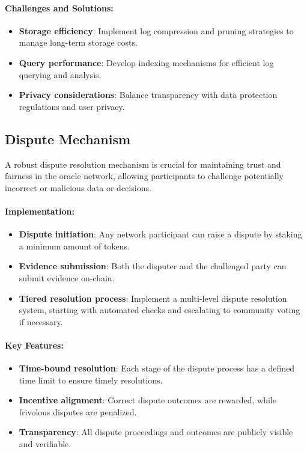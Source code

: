 \documentclass[12pt,a4paper]{article}
\begin{document}
	\paragraph{Challenges and Solutions:}
	\begin{itemize}
		\item \textbf{Storage efficiency}: Implement log compression and pruning strategies to manage long-term storage costs.
		\item \textbf{Query performance}: Develop indexing mechanisms for efficient log querying and analysis.
		\item \textbf{Privacy considerations}: Balance transparency with data protection regulations and user privacy.
	\end{itemize}
	
	\subsection{Dispute Mechanism}
	A robust dispute resolution mechanism is crucial for maintaining trust and fairness in the oracle network, allowing participants to challenge potentially incorrect or malicious data or decisions.
	
	\paragraph{Implementation:}
	\begin{itemize}
		\item \textbf{Dispute initiation}: Any network participant can raise a dispute by staking a minimum amount of tokens.
		\item \textbf{Evidence submission}: Both the disputer and the challenged party can submit evidence on-chain.
		\item \textbf{Tiered resolution process}: Implement a multi-level dispute resolution system, starting with automated checks and escalating to community voting if necessary.
	\end{itemize}
	
	\paragraph{Key Features:}
	\begin{itemize}
		\item \textbf{Time-bound resolution}: Each stage of the dispute process has a defined time limit to ensure timely resolutions.
		\item \textbf{Incentive alignment}: Correct dispute outcomes are rewarded, while frivolous disputes are penalized.
		\item \textbf{Transparency}: All dispute proceedings and outcomes are publicly visible and verifiable.
	\end{itemize}
	
\end{document}
